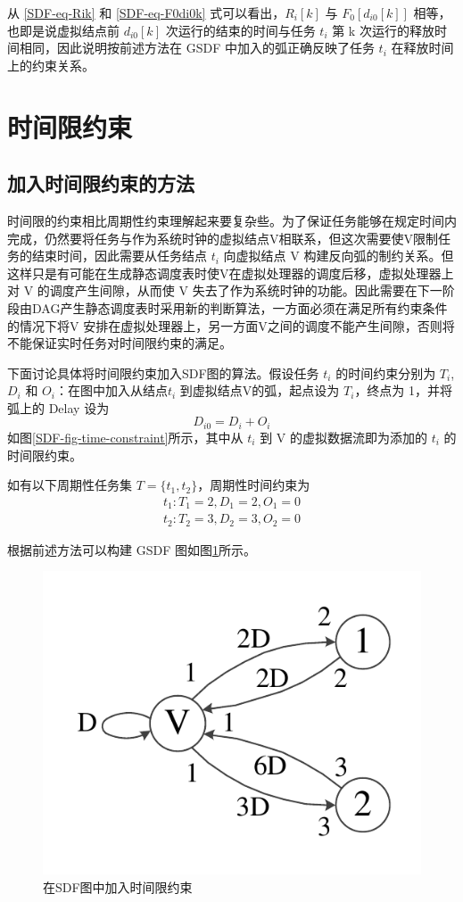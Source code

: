 从 \eqref{SDF-eq-Rik} 和 \eqref{SDF-eq-F0di0k} 式可以看出，$R_i[k]$ 与 $F_0[d_{i0}[k]]$ 相等，也即是说虚拟结点前 $d_{i0}[k]$ 次运行的结束的时间与任务 $t_i$ 第 k 次运行的释放时间相同，因此说明按前述方法在 GSDF 中加入的弧正确反映了任务 $t_i$ 在释放时间上的约束关系。



\section{时间限约束}

\subsection{加入时间限约束的方法}

时间限的约束相比周期性约束理解起来要复杂些。为了保证任务能够在规定时间内完成，仍然要将任务与作为系统时钟的虚拟结点V相联系，但这次需要使V限制任务的结束时间，因此需要从任务结点 $t_i$ 向虚拟结点 V 构建反向弧的制约关系。但这样只是有可能在生成静态调度表时使V在虚拟处理器的调度后移，虚拟处理器上对 V 的调度产生间隙，从而使 V 失去了作为系统时钟的功能。因此需要在下一阶段由DAG产生静态调度表时采用新的判断算法，一方面必须在满足所有约束条件的情况下将V 安排在虚拟处理器上，另一方面V之间的调度不能产生间隙，否则将不能保证实时任务对时间限约束的满足。

下面讨论具体将时间限约束加入SDF图的算法。假设任务 $t_i$ 的时间约束分别为 $T_i$,$D_i$ 和 $O_i$：在图中加入从结点$t_i$ 到虚拟结点V的弧，起点设为 $T_i$，终点为 1，并将弧上的 Delay 设为
\begin{equation}
  \label{SDF-eq-deadline}
  D_{i0}=D_i+O_i
\end{equation}
如图\ref{SDF-fig-time-constraint}所示，其中从 $t_i$ 到 V 的虚拟数据流即为添加的 $t_i$ 的时间限约束。


如有以下周期性任务集 $T=\{t_1, t_2\}$，周期性时间约束为
\begin{gather*}
  t_1: T_1=2, D_1=2, O_1=0\\
  t_2: T_2=3, D_2=3, O_2=0
\end{gather*}

根据前述方法可以构建 GSDF 图如图\ref{SDF-fig-deadline}所示。

\begin{figure}[!htb]
  \centering
  \includegraphics[height=20ex]{figure/SDF-4-deadline.pdf}
  \caption{在SDF图中加入时间限约束}
  \label{SDF-fig-deadline}
\end{figure}

